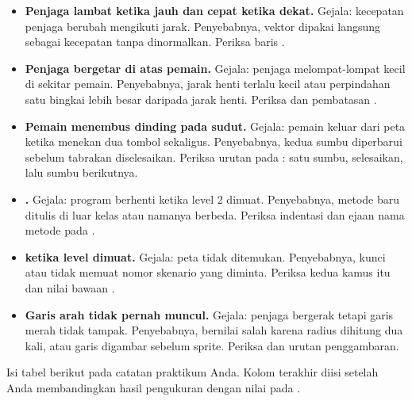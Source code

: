 \begin{galatbox}
\begin{itemize}[leftmargin=1.4em, itemsep=0.35em]
  \item \textbf{Penjaga lambat ketika jauh dan cepat ketika dekat.}
        Gejala: kecepatan penjaga berubah mengikuti jarak. Penyebabnya, vektor
         dipakai langsung sebagai kecepatan tanpa dinormalkan.
        Periksa baris .
  \item \textbf{Penjaga bergetar di atas pemain.}
        Gejala: penjaga melompat-lompat kecil di sekitar pemain. Penyebabnya,
        jarak henti terlalu kecil atau perpindahan satu bingkai lebih besar
        daripada jarak henti. Periksa  dan
        pembatasan .
  \item \textbf{Pemain menembus dinding pada sudut.}
        Gejala: pemain keluar dari peta ketika menekan dua tombol sekaligus.
        Penyebabnya, kedua sumbu diperbarui sebelum tabrakan diselesaikan.
        Periksa urutan pada : satu sumbu, selesaikan,
        lalu sumbu berikutnya.
  \item \textbf{.}
        Gejala: program berhenti ketika level 2 dimuat. Penyebabnya, metode baru
        ditulis di luar kelas atau namanya berbeda. Periksa indentasi dan ejaan
        nama metode pada .
  \item \textbf{ ketika level dimuat.}
        Gejala: peta tidak ditemukan. Penyebabnya, kunci  atau
         tidak memuat nomor skenario yang diminta. Periksa
        kedua kamus itu dan nilai bawaan .
  \item \textbf{Garis arah tidak pernah muncul.}
        Gejala: penjaga bergerak tetapi garis merah tidak tampak. Penyebabnya,
         bernilai salah karena radius dihitung dua kali, atau
        garis digambar sebelum sprite. Periksa
         dan urutan penggambaran.
\end{itemize}
\end{galatbox}

\clearpage
{}

Isi tabel berikut pada catatan praktikum Anda. Kolom terakhir diisi setelah
Anda membandingkan hasil pengukuran dengan nilai pada .

